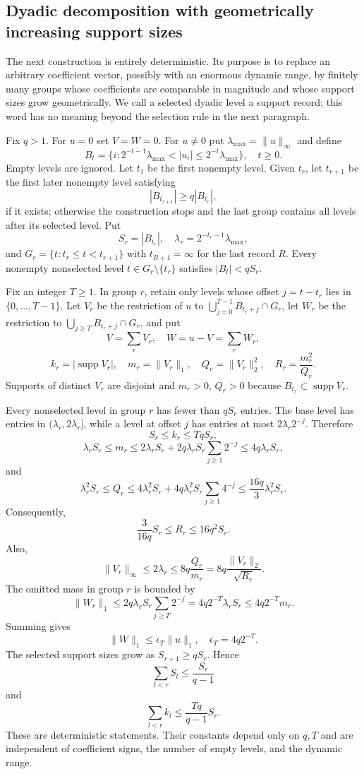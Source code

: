\documentclass[11pt]{article}
\numberwithin{equation}{section}
\theoremstyle{definition}
\theoremstyle{remark}
\newcommand{\1}{\boldsymbol 1}
\begin{document}
\begin{aiblock}
\subsection{Dyadic decomposition with geometrically
  increasing support sizes}\label{deterministic-record-decomposition}

The next construction is entirely deterministic. Its
purpose is to replace an arbitrary coefficient vector,
possibly with an enormous dynamic range, by finitely
many groups whose coefficients are comparable in
magnitude and whose support sizes grow geometrically. We
call a selected dyadic level a support record; this word
has no meaning beyond the selection rule in the next
paragraph.

Fix $q>1$. For $u=0$ set $V=W=0$. For $u\ne0$ put
$\lambda_{\max}=\|u\|_\infty$ and define
\[
  B_t=\{i:2^{-t-1}\lambda_{\max}<|u_i|
  \le2^{-t}\lambda_{\max}\},\quad t\ge0.
\]
Empty levels are ignored. Let $t_1$ be the first
nonempty level. Given $t_r$, let $t_{r+1}$ be the
first later nonempty level satisfying
\[
  |B_{t_{r+1}}|\ge q|B_{t_r}|,
\]
if it exists; otherwise the construction stops and the
last group contains all levels after its selected level.
Put
\[
  S_r=|B_{t_r}|,\quad
  \lambda_r=2^{-t_r-1}\lambda_{\max},
\]
and $G_r=\{t:t_r\le t<t_{r+1}\}$ with
$t_{R+1}=\infty$ for the last record $R$. Every
nonempty nonselected level $t\in G_r\setminus\{t_r\}$
satisfies $|B_t|<qS_r$.

Fix an integer $T\ge1$. In group $r$, retain only
levels whose offset $j=t-t_r$ lies in
$\{0,\dots,T-1\}$. Let $V_r$ be the restriction of $u$
to $\bigcup_{j=0}^{T-1}B_{t_r+j}\cap G_r$, let $W_r$
be the restriction to $\bigcup_{j\ge T}B_{t_r+j}\cap
G_r$, and put
\[
  V=\sum_rV_r,\quad W=u-V=\sum_rW_r,
\]
\[
  k_r=|\operatorname{supp}V_r|,\quad
  m_r=\|V_r\|_1,\quad Q_r=\|V_r\|_2^2,\quad
  R_r=\frac{m_r^2}{Q_r}.
\]
Supports of distinct $V_r$ are disjoint and $m_r>0$,
$Q_r>0$ because $B_{t_r}\subset\operatorname{supp}V_r$.

Every nonselected level in group $r$ has fewer than
$qS_r$ entries. The base level has entries in
$(\lambda_r,2\lambda_r]$, while a level at offset $j$
has entries at most $2\lambda_r2^{-j}$. Therefore
\[
  S_r\le k_r\le TqS_r,
\]
\[
  \lambda_rS_r\le m_r\le2\lambda_rS_r
  +2q\lambda_rS_r\sum_{j\ge1}2^{-j}
  \le4q\lambda_rS_r,
\]
and
\[
  \lambda_r^2S_r\le Q_r\le4\lambda_r^2S_r
  +4q\lambda_r^2S_r\sum_{j\ge1}4^{-j}
  \le\frac{16q}{3}\lambda_r^2S_r.
\]
Consequently,
\[
  \frac3{16q}S_r\le R_r\le16q^2S_r.
\]
Also,
\[
  \|V_r\|_\infty\le2\lambda_r\le8q\frac{Q_r}{m_r}
  =8q\frac{\|V_r\|_2}{\sqrt{R_r}}.
\]
The omitted mass in group $r$ is bounded by
\[
  \|W_r\|_1\le2q\lambda_rS_r\sum_{j\ge T}2^{-j}
  =4q2^{-T}\lambda_rS_r\le4q2^{-T}m_r.
\]
Summing gives
\[
  \|W\|_1\le\epsilon_T\|u\|_1,\quad
  \epsilon_T=4q2^{-T}.
\]
The selected support sizes grow as $S_{r+1}\ge qS_r$.
Hence
\[
  \sum_{l<r}S_l\le\frac{S_r}{q-1}
\]
and
\[
  \sum_{l<r}k_l\le\frac{Tq}{q-1}S_r.
\]
These are deterministic statements. Their constants
depend only on $q,T$ and are independent of coefficient
signs, the number of empty levels, and the dynamic
range.


\end{aiblock}
\end{document}
